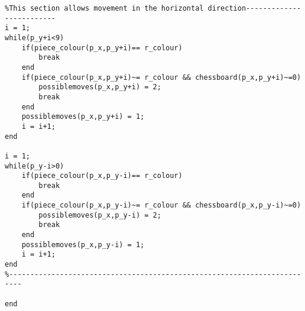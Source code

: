 \documentclass{article}
\begin{document}
\begin{lstlisting}
%This section allows movement in the horizontal direction-------------------------
i = 1;
while(p_y+i<9)
    if(piece_colour(p_x,p_y+i)== r_colour)
        break
    end
    if(piece_colour(p_x,p_y+i)~= r_colour && chessboard(p_x,p_y+i)~=0)
        possiblemoves(p_x,p_y+i) = 2;
        break
    end
    possiblemoves(p_x,p_y+i) = 1;
    i = i+1;
end

i = 1;
while(p_y-i>0)
    if(piece_colour(p_x,p_y-i)== r_colour)
        break
    end
    if(piece_colour(p_x,p_y-i)~= r_colour && chessboard(p_x,p_y-i)~=0)
        possiblemoves(p_x,p_y-i) = 2;
        break
    end
    possiblemoves(p_x,p_y-i) = 1;
    i = i+1;
end
%-------------------------------------------------------------------------

end
\end{lstlisting}
\end{document}
